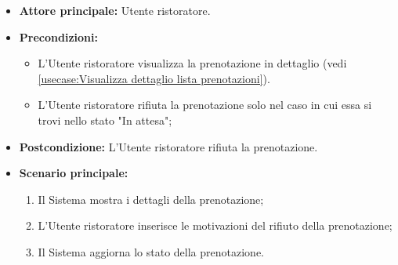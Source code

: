 \label{usecase:Rifiuta prenotazione}
\begin{itemize}
	\item \textbf{Attore principale:} Utente ristoratore.

	\item \textbf{Precondizioni:} 
	\begin{itemize}
		\item L'Utente ristoratore visualizza la prenotazione in dettaglio (vedi \autoref{usecase:Visualizza dettaglio lista prenotazioni}).
		\item L'Utente ristoratore rifiuta la prenotazione solo nel caso in cui essa si trovi nello stato "In attesa";
	\end{itemize}
	
	\item \textbf{Postcondizione:} L'Utente ristoratore rifiuta la prenotazione.



	\item \textbf{Scenario principale:}
	      \begin{enumerate}
		      \item Il Sistema mostra i dettagli della prenotazione;
		      \item L'Utente ristoratore inserisce le motivazioni del rifiuto della prenotazione;
		      \item Il Sistema aggiorna lo stato della prenotazione.

	      \end{enumerate}
\end{itemize}
